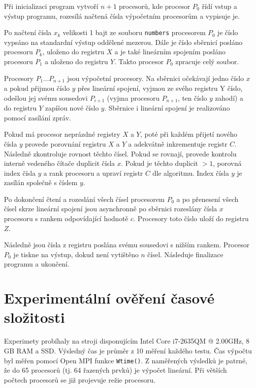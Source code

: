 \documentclass[11pt,a4paper]{article}
\begin{document}
Při inicializaci program vytvoří $n+1$ procesorů, kde procesor $P_0$ řídí vstup a výstup programu, rozesílá načtená čísla výpočetním procesorům a vypisuje je.

Po načtení čísla $x_k$ velikosti 1 bajt ze souboru \texttt{numbers} procesorem $P_0$ je číslo vypsáno na standardní výstup oddělené mezerou. Dále je číslo sběrnicí posláno procesoru $P_k$, uloženo do registru $X$ a je také lineárním spojením posláno procesoru $P_1$ a uloženo do registru $Y$. Takto procesor $P_0$ zpracuje celý soubor.

Procesory $P_1 ... P_{n+1}$ jsou výpočetní procesory. Na sběrnici očekávají jedno číslo $x$ a pokud přijmou číslo $y$ přes lineární spojení, vyjmou ze svého registru Y číslo, odešlou jej svému sousedovi $P_{i+1}$ (vyjma procesoru $P_{n+1}$, ten číslo $y$ zahodí) a do registru $Y$ zapíšou nové číslo $y$. Sběrnice i lineární spojení je realizováno pomocí zasílání zpráv.

Pokud má procesor neprázdné registry $X$ a $Y$, poté při každém přijetí nového čísla $y$ provede porovnání registru $X$ a $Y$ a adekvátně inkrementuje registr $C$. Následně zkontroluje rovnost těchto čísel. Pokud se rovnají, provede kontrolu interně vedeného čítače duplicit čísla $x$. Pokud je těchto duplicit $>1$, porovná index čísla $y$ a rank procesoru a upraví registr $C$ dle algoritmu. Index čísla $y$ je zasílán společně s číslem $y$.

Po dokončení čtení a rozeslání všech čísel procesorem $P_0$ a po přenesení všech čísel skrze lineární spojení jsou asynchronně po sběrnici rozeslány čísla $x$ procesoru s rankem odpovídající hodnotě $c$. Procesory toto číslo uloží do registru $Z$.

Následně jsou čísla z registru poslána svému sousedovi s nižším rankem. Procesor $P_0$ je tiskne na výstup, dokud není vytištěno $n$ čísel. Následuje finalizace programu a ukončení.

\section{Experimentální ověření časové složitosti}

Experimety probíhaly na stroji disponujícím Intel Core i7-2635QM @ 2.00GHz, 8 GB RAM a SSD. Výsledný čas je průměr z 10 měření každého testu. Čas výpočtu byl měřen pomocí Open MPI funkce \texttt{Wtime()}. Z naměřených výsledků je patrné, že do 65 procesorů (tj. 64 řazených prvků) je výpočet lineární. Při větších počtech procesorů se již projevuje režie procesoru.
\end{document}
